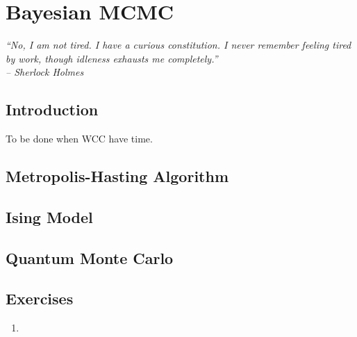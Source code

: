 
\chapter{Bayesian MCMC}
\label{chp:mcmc}

{\it
``No, I am not tired. I have a curious constitution. I never remember
feeling tired by work, though idleness exhausts me completely.'' \\
\--- Sherlock Holmes
}


\section{Introduction}

To be done when WCC have time.



\section{Metropolis-Hasting Algorithm}




\section{Ising Model}




\section{Quantum Monte Carlo}




\section{Exercises}
\label{sec:mle_exercise}

\begin{enumerate}[label=\thechapter-\arabic*]

\item


\end{enumerate}

